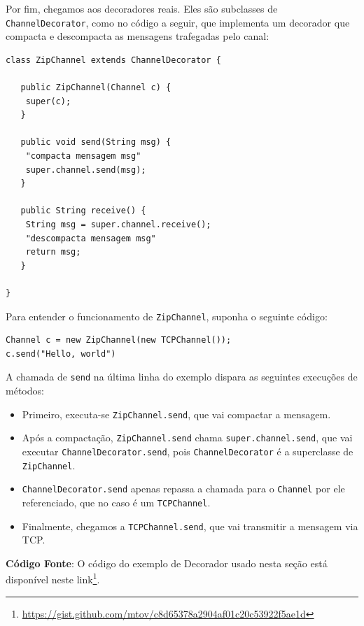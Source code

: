 \documentclass[
  11pt,
  twoside]{book}
\newcommand{\passthrough}[1]{#1}
\DeclareRobustCommand{\href}[2]{#2\footnote{\url{#1}}}
\begin{document}
Por fim, chegamos aos decoradores reais. Eles são subclasses de
\passthrough{\lstinline!ChannelDecorator!}, como no código a seguir, que
implementa um decorador que compacta e descompacta as mensagens
trafegadas pelo canal:

\begin{lstlisting}
class ZipChannel extends ChannelDecorator {

   public ZipChannel(Channel c) {
    super(c);
   }  

   public void send(String msg) {
    "compacta mensagem msg"
    super.channel.send(msg);
   }

   public String receive() {
    String msg = super.channel.receive();
    "descompacta mensagem msg"
    return msg;
   }

}
\end{lstlisting}

Para entender o funcionamento de \passthrough{\lstinline!ZipChannel!},
suponha o seguinte código:

\begin{lstlisting}
Channel c = new ZipChannel(new TCPChannel());
c.send("Hello, world")
\end{lstlisting}

A chamada de \passthrough{\lstinline!send!} na última linha do exemplo
dispara as seguintes execuções de métodos:

\begin{itemize}
\item
  Primeiro, executa-se \passthrough{\lstinline!ZipChannel.send!}, que
  vai compactar a mensagem.
\item
  Após a compactação, \passthrough{\lstinline!ZipChannel.send!} chama
  \passthrough{\lstinline!super.channel.send!}, que vai executar
  \passthrough{\lstinline!ChannelDecorator.send!}, pois
  \passthrough{\lstinline!ChannelDecorator!} é a superclasse de
  \passthrough{\lstinline!ZipChannel!}.
\item
  \passthrough{\lstinline!ChannelDecorator.send!} apenas repassa a
  chamada para o \passthrough{\lstinline!Channel!} por ele referenciado,
  que no caso é um \passthrough{\lstinline!TCPChannel!}.
\item
  Finalmente, chegamos a \passthrough{\lstinline!TCPChannel.send!}, que
  vai transmitir a mensagem via TCP.
\end{itemize}

\textbf{Código Fonte}: O código do exemplo de Decorador usado nesta
seção está disponível neste
\href{https://gist.github.com/mtov/c8d65378a2904af01c20c53922f5ae1d}{link}.
\end{document}
